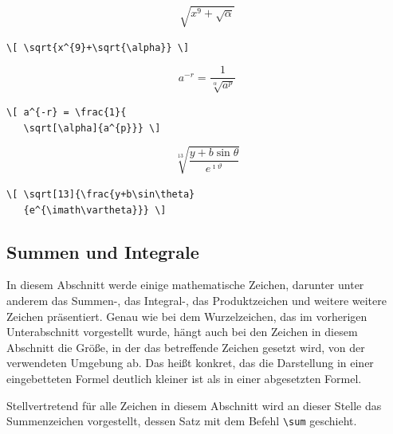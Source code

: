 \documentclass[a4paper,10pt,twoside]{scrbook}
\begin{document}
\begin{minipage}[c]{.4\textwidth}
\vspace*{-5mm}
\[ \sqrt{x^{9}+\sqrt{\alpha}} \]
\end{minipage}
\hfill
\begin{minipage}[c]{.58\textwidth}
\setlength{\parskip}{1em}
\verb!\[ \sqrt{x^{9}+\sqrt{\alpha}} \] !
\end{minipage}

\begin{minipage}[c]{.4\textwidth}
\vspace*{-5mm}
\[ a^{-r} = \frac{1}{
   \sqrt[\alpha]{a^{p}}} \]
\end{minipage}
\hfill
\begin{minipage}[c]{.58\textwidth}
\setlength{\parskip}{1em}
\verb!\[ a^{-r} = \frac{1}{! \\
\verb!   \sqrt[\alpha]{a^{p}}} \]!
\end{minipage}

\begin{minipage}[c]{.4\textwidth}
\vspace*{-5mm}
\[ \sqrt[13]{\frac{y+b\sin\theta}
   {e^{\imath\vartheta}}} \]
\end{minipage}
\hfill
\begin{minipage}[c]{.58\textwidth}
\setlength{\parskip}{1em}
\verb!\[ \sqrt[13]{\frac{y+b\sin\theta}! \\
\verb!   {e^{\imath\vartheta}}} \]!
\end{minipage}


\subsection{Summen und Integrale}

In diesem Abschnitt werde einige 
mathematische Zeichen, darunter unter anderem 
das Summen-, das Integral-, das Produktzeichen und weitere weitere Zeichen
präsentiert. Genau wie bei dem Wurzelzeichen, das im vorherigen Unterabschnitt vorgestellt wurde, 
hängt auch bei den Zeichen in diesem Abschnitt die Größe, in der das betreffende Zeichen gesetzt wird, 
von der verwendeten Umgebung ab. Das heißt konkret, das die Darstellung in
einer eingebetteten Formel deutlich kleiner ist als in einer abgesetzten Formel.

Stellvertretend für alle Zeichen in diesem Abschnitt wird an dieser Stelle das
Summenzeichen vorgestellt, dessen 
Satz mit dem Befehl \verb!\sum! geschieht.
\end{document}
